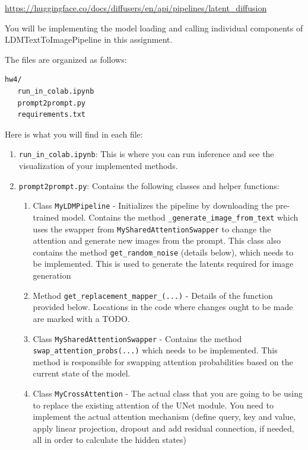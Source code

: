 \documentclass[11pt,addpoints,answers]{exam}
\begin{document}
\begin{questions}
\url{https://huggingface.co/docs/diffusers/en/api/pipelines/latent_diffusion}

You will be implementing the model loading and calling individual components of LDMTextToImagePipeline in this assignment.


The files are organized as follows:
\begin{verbatim}
hw4/
   run_in_colab.ipynb
   prompt2prompt.py
   requirements.txt
\end{verbatim}

Here is what you will find in each file:
\begin{enumerate}

    \item \lstinline{run_in_colab.ipynb}: This is where you can run inference and see the visualization of your implemented methods.
    
    \item \lstinline{prompt2prompt.py}: Contains the following classes and helper functions:
    \begin{enumerate}
        \item Class \lstinline{MyLDMPipeline} - Initializes the pipeline by downloading the pre-trained model. Contains the method \lstinline{_generate_image_from_text} which uses the swapper from \lstinline{MySharedAttentionSwapper} to change the attention and generate new images from the prompt. This class also contains the method \lstinline{get_random_noise} (details below), which needs to be implemented. This is used to generate the latents required for image generation

        \item Method \lstinline{get_replacement_mapper_(...)} - Details of the function provided below. Locations in the code where changes ought to be made are marked with a TODO.

        \item Class \lstinline{MySharedAttentionSwapper} - Contains the method \lstinline{swap_attention_probs(...)} which needs to be implemented. This method is responsible for swapping attention probabilities based on the current state of the model.

        \item Class \lstinline{MyCrossAttention} - The actual class that you are going to be using to replace the existing attention of the UNet module. You need to implement the actual attention mechanism (define query, key and value, apply linear projection, dropout and add residual connection, if needed, all in order to calculate the hidden states)
    \end{enumerate}


\end{enumerate}
\end{questions}
\end{document}
